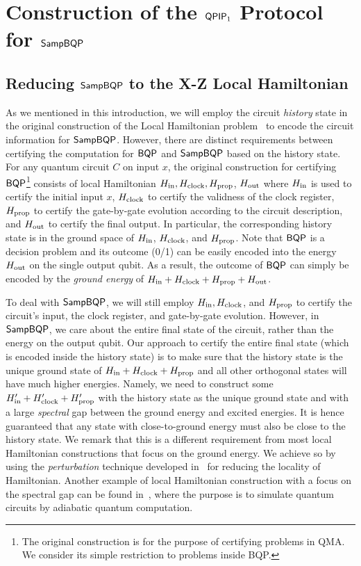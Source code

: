 \section{Construction of the $\operatorname{\mathsf{QPIP}}_1$ Protocol for $\operatorname{\mathsf{SampBQP}}$}
\label{sec:sampbqp}

\subsection{Reducing $\operatorname{\mathsf{SampBQP}}$ to the X-Z Local Hamiltonian} \label{sec:LHXZ}
As we mentioned in this introduction, we will employ the circuit \emph{history} state in the original construction of the Local Hamiltonian problem~\cite{kitaev2002classical} to encode the circuit information for $\operatorname{\mathsf{SampBQP}}$.
However, there are distinct requirements between certifying the computation for $\operatorname{\mathsf{BQP}}$ and $\operatorname{\mathsf{SampBQP}}$ based on the history state.
For any quantum circuit $C$ on input $x$, the original construction for certifying $\operatorname{\mathsf{BQP}}$\footnote{The original construction is for the purpose of certifying problems in QMA. We consider its simple restriction to problems inside BQP.} consists of local Hamiltonian $H_{\mathrm{in}}, H_{\mathrm{clock}}, H_{\mathrm{prop}}$, $H_{\mathrm{out}}$ where $H_{\mathrm{in}}$ is used to certify the initial input $x$, $H_{\mathrm{clock}}$ to certify the validness of the clock register,  $H_{\mathrm{prop}}$ to certify the gate-by-gate evolution according to the circuit description, and $H_{\mathrm{out}}$ to certify the final output.
In particular, the corresponding history state is in the ground space of $H_{\mathrm{in}}$, $H_{\mathrm{clock}}$, and $H_{\mathrm{prop}}$. Note that $\operatorname{\mathsf{BQP}}$ is a decision problem and its outcome (0/1) can be easily encoded into the energy $H_{\mathrm{out}}$ on the single output qubit.
As a result, the outcome of $\operatorname{\mathsf{BQP}}$ can simply be encoded by the \emph{ground energy} of $H_{\mathrm{in}} + H_{\mathrm{clock}}+H_{\mathrm{prop}} + H_{\mathrm{out}}$.

To deal with $\operatorname{\mathsf{SampBQP}}$, we will still employ $H_{\mathrm{in}}, H_{\mathrm{clock}}$, and $H_{\mathrm{prop}}$ to certify the circuit's input, the clock register, and gate-by-gate evolution. However, in $\operatorname{\mathsf{SampBQP}}$, we care about the entire final state of the circuit, rather than the energy on the output qubit.
Our approach to certify the entire final state (which is encoded inside the history state) is to make sure that the history state is the unique ground state of $H_{\mathrm{in}} + H_{\mathrm{clock}}+ H_{\mathrm{prop}}$ and all other orthogonal states will have much higher energies.
Namely, we need to construct some $H_{\mathrm{in}}'+ H_{\mathrm{clock}}'+ H_{\mathrm{prop}}'$ with the history state as the unique ground state and with a large \emph{spectral} gap between the ground energy and excited energies.
It is hence guaranteed that any state with close-to-ground energy must also be close to the history state.
We remark that this is a different requirement from most local Hamiltonian constructions that focus on the ground energy.
We achieve so by using the \emph{perturbation} technique developed in~\cite{kempe_kitaev_regev_2006} for reducing the locality of Hamiltonian.
Another example of local Hamiltonian construction with a focus on the spectral gap can be found in~\cite{adiabatic}, where the purpose is to simulate quantum circuits by adiabatic quantum computation.

